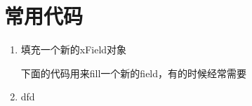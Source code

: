 \documentclass{article}
\begin{document}
\begin{enumerate}
\end{enumerate}

\section{常用代码}
\label{sec:utility-codes}

\begin{enumerate}
\item 填充一个新的xField对象

下面的代码用来fill一个新的field，有的时候经常需要



\item dfd

\end{enumerate}
\end{document}
